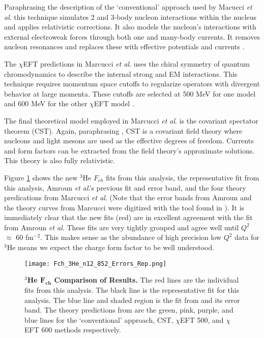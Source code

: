 Paraphrasing the description of the `conventional' approach used by Macucci \textit{et al}. this technique simulates 2 and 3-body nucleon interactions within the nucleus and applies relativistic corrections. It also models the nucleon's interactions with external electroweak forces through both one and many-body currents. It removes nucleon resonances and replaces these with effective potentials and currents \cite{Article:Marcucci}.

The $\chi$EFT predictions in Marcucci \textit{et al}. uses the chiral symmetry of quantum chromodynamics to describe the internal strong and EM interactions. This technique requires momentum space cutoffs to regularize operators with divergent behavior at large momenta. These cutoffs are selected at 500 MeV for one model and 600 MeV for the other $\chi$EFT model \cite{Article:Marcucci}.

The final theoretical model employed in Marcucci \textit{et al}. is the covariant spectator theorem (CST). Again, paraphrasing \cite{Article:Marcucci}, CST is a covariant field theory where nucleons and light mesons are used as the effective degrees of freedom. Currents and form factors can be extracted from the field theory's approximate solutions. This theory is also fully relativistic.

Figure \ref{fig:3he_fch_theory} shows the new $^3$He $F_{ch}$ fits from this analysis, the representative fit from this analysis, Amroun \textit{et al}.'s previous fit and error band, and the four theory predications from Marcucci \textit{et al}. (Note that the error bands from Amroun and the theory curves from Marcucci were digitized with the tool found in \cite{web_plot_digitizer}). It is immediately clear that the new fits (red) are in excellent agreement with the fit from Amroun \textit{et al}. These fits are very tightly grouped and agree well until $Q^2$ $\approx$ 60 fm$^{-2}$. This makes sense as the abundance of high precision low $Q^2$ data for $^3$He means we expect the charge form factor to be well understood. 


\begin{figure}[!ht]
	\begin{center}
	\texttt{[image: Fch\_3He\_n12\_852\_Errors\_Rep.png]}
	\end{center}
	\caption[$^3$He $F_{ch}$ Comparison of Results]{
	{\bf{$^3$He $\boldsymbol{F_{ch}}$ Comparison of Results.}} The red lines are the individual fits from this analysis. The black line is the representative fit for this analysis. The blue line and shaded region is the fit from \cite{Article:Amroun} and its error band. The theory predictions from \cite{Article:Marcucci} are the green, pink, purple, and blue lines for the `conventional' approach, CST, $\chi$EFT 500, and $\chi$EFT 600 methods respectively.}
	\label{fig:3he_fch_theory}
\end{figure}
	
